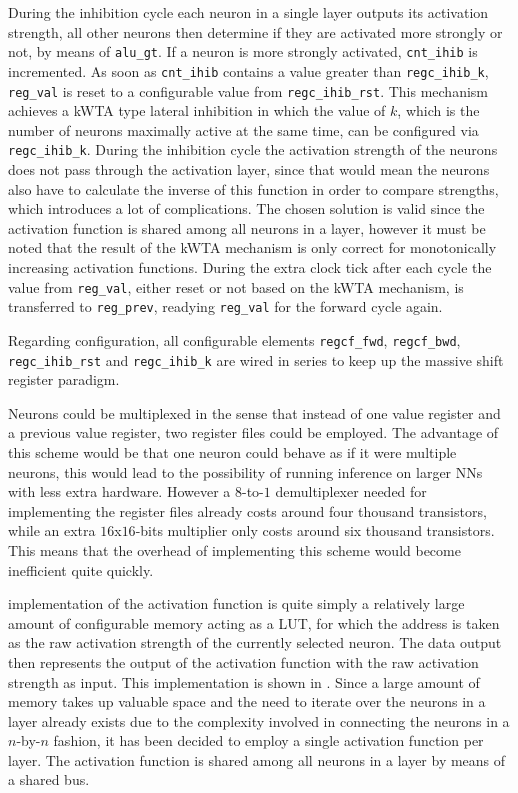 During the inhibition cycle each neuron in a single layer outputs its activation strength, all other neurons then determine if they are activated more strongly or not, by means of \texttt{alu\_gt}. If a neuron is more strongly activated, \texttt{cnt\_ihib} is incremented. As soon as \texttt{cnt\_ihib} contains a value greater than \texttt{regc\_ihib\_k}, \texttt{reg\_val} is reset to a configurable value from \texttt{regc\_ihib\_rst}. This mechanism achieves a \ac{kWTA} type lateral inhibition in which the value of $k$, which is the number of neurons maximally active at the same time, can be configured via \texttt{regc\_ihib\_k}. During the inhibition cycle the activation strength of the neurons does not pass through the activation layer, since that would mean the neurons also have to calculate the inverse of this function in order to compare strengths, which introduces a lot of complications. The chosen solution is valid since the activation function is shared among all neurons in a layer, however it must be noted that the result of the \ac{kWTA} mechanism is only correct for monotonically increasing activation functions. During the extra clock tick after each cycle the value from \texttt{reg\_val}, either reset or not based on the \ac{kWTA} mechanism, is transferred to \texttt{reg\_prev}, readying \texttt{reg\_val} for the forward cycle again.

Regarding configuration, all configurable elements \texttt{regcf\_fwd}, \texttt{regcf\_bwd}, \texttt{regc\_ihib\_rst} and \texttt{regc\_ihib\_k} are wired in series to keep up the massive shift register paradigm.

Neurons could be multiplexed in the sense that instead of one value register and a previous value register, two register files could be employed. The advantage of this scheme would be that one neuron could behave as if it were multiple neurons, this would lead to the possibility of running inference on larger \acp{NN} with less extra hardware. However a $8$-to-$1$ demultiplexer needed for implementing the register files already costs around four thousand transistors, while an extra $16$x$16$-bits multiplier only costs around six thousand transistors. This means that the overhead of implementing this scheme would become inefficient quite quickly.

 implementation of the activation function is quite simply a relatively large amount of configurable memory acting as a \ac{LUT}, for which the address is taken as the raw activation strength of the currently selected neuron. The data output then represents the output of the activation function with the raw activation strength as input. This implementation is shown in . Since a large amount of memory takes up valuable space and the need to iterate over the neurons in a layer already exists due to the complexity involved in connecting the neurons in a $n$-by-$n$ fashion, it has been decided to employ a single activation function per layer. The activation function is shared among all neurons in a layer by means of a shared bus.


